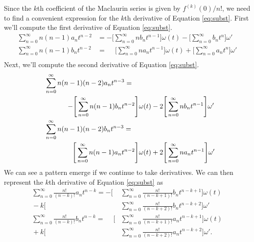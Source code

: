 \documentclass{report}
\begin{document}
Since the $k$th coefficient of the Maclaurin series is given by $f^{(k)}(0)/n!$, we need to find a convenient expression for the $k$th derivative of
Equation \ref{eq:subst}.
First we'll compute the first derivative of Equation \ref{eq:subst}.
\begin{equation} \label{eq:diff1}
    \begin{aligned}
    \sum_{n=0}^\infty n(n-1)a_n t^{n-2} &=
        -\Bigg[\sum_{n=0}^\infty nb_n t^{n-1} \Bigg]
            \omega(t)
                - \Bigg[\sum_{n=0}^\infty b_n t^n \Bigg]
                \omega'\\
    \sum_{n=0}^\infty n(n-1)b_n t^{n-2} &=
        \phantom{-}\Bigg[\sum_{n=0}^\infty na_n t^{n-1} \Bigg]
            \omega(t)
                + \Bigg[\sum_{n=0}^\infty a_n t^n \Bigg]
                \omega'\\
    \end{aligned}
\end{equation}
Next, we'll compute the second derivative of Equation \ref{eq:subst}.
\begin{equation} \label{eq:diff2}
    \begin{gathered}
    \shoveleft{\sum_{n=0}^\infty n(n-1)(n-2)a_n t^{n-3} =}\\
        \qquad\qquad-\Bigg[\sum_{n=0}^\infty n(n-1)b_n t^{n-2} \Bigg]
             \omega(t)
                - 2\Bigg[\sum_{n=0}^\infty n b_n t^{n-1} \Bigg]
                \omega'\\
    \shoveleft{\sum_{n=0}^\infty n(n-1)(n-2)b_n t^{n-3} =}\\
        \qquad\qquad\phantom{-}\Bigg[\sum_{n=0}^\infty n(n-1)a_n t^{n-2} \Bigg]
            \omega(t)
                + 2\Bigg[\sum_{n=0}^\infty n a_n t^{n-1} \Bigg]
                \omega'\\
    \end{gathered}
\end{equation}
We can see a pattern emerge if we continue to take derivatives.
We can then represent the $k$th derivative of Equation \ref{eq:subst} as
\begin{equation} \label{eq:diffk}
    \begin{aligned}
    \sum_{n=0}^\infty \frac{n!}{(n-k)!} a_n t^{n-k} =
        -\Bigg[&\sum_{n=0}^\infty \frac{n!}{(n-k+1)!} b_n t^{n-k+1} \Bigg]
             \omega(t)
                \\
                {}-k\Bigg[&\sum_{n=0}^\infty \frac{n!}{(n-k+2)!} b_n t^{n-k+2} \Bigg]
                \omega'\\
    \sum_{n=0}^\infty \frac{n!}{(n-k)!} b_n t^{n-k} =
        \phantom{-}\Bigg[&\sum_{n=0}^\infty \frac{n!}{(n-k+1)!} a_n t^{n-k+1} \Bigg]
             \omega(t)
                \\
                {}+ k\Bigg[&\sum_{n=0}^\infty \frac{n!}{(n-k+2)!} a_n t^{n-k+2} \Bigg]
                \omega'.\\
    \end{aligned}
\end{equation}
\end{document}

